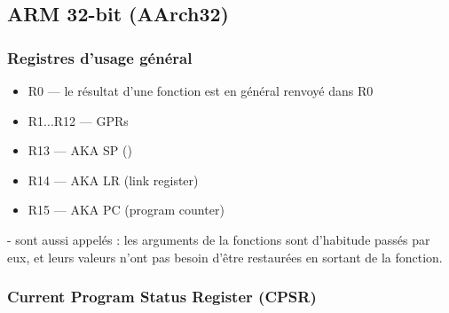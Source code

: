 \subsection{ARM 32-bit (AArch32)}

\subsubsection{Registres d'usage général}

\begin{itemize}
	\item R0 --- le résultat d'une fonction est en général renvoyé dans R0
	\item R1...R12 --- \ac{GPR}s
	\item R13 --- \ac{AKA} SP ()
	\item R14 --- \ac{AKA} LR (\gls{link register})
	\item R15 --- \ac{AKA} PC (program counter)
\end{itemize}

- sont aussi appelés : les arguments de la fonctions sont
d'habitude passés par eux, et leurs valeurs n'ont pas besoin d'être restaurées en sortant de la
fonction.

\subsubsection{Current Program Status Register (CPSR)}

